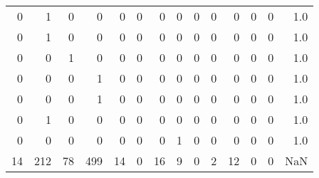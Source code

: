 \begin{tabular}{rrrrrrrrrrrrrr}
       0 &       1 &          0 &               0 &                0 &       0 &          0 &          0 &         0 &         0 &      0 &             0 &         0 &      1.0 \\
       0 &       1 &          0 &               0 &                0 &       0 &          0 &          0 &         0 &         0 &      0 &             0 &         0 &      1.0 \\
       0 &       0 &          1 &               0 &                0 &       0 &          0 &          0 &         0 &         0 &      0 &             0 &         0 &      1.0 \\
       0 &       0 &          0 &               1 &                0 &       0 &          0 &          0 &         0 &         0 &      0 &             0 &         0 &      1.0 \\
       0 &       0 &          0 &               1 &                0 &       0 &          0 &          0 &         0 &         0 &      0 &             0 &         0 &      1.0 \\
       0 &       1 &          0 &               0 &                0 &       0 &          0 &          0 &         0 &         0 &      0 &             0 &         0 &      1.0 \\
       0 &       0 &          0 &               0 &                0 &       0 &          0 &          1 &         0 &         0 &      0 &             0 &         0 &      1.0 \\
      14 &     212 &         78 &             499 &               14 &       0 &         16 &          9 &         0 &         2 &     12 &             0 &         0 &      NaN \\
\bottomrule
\end{tabular}
